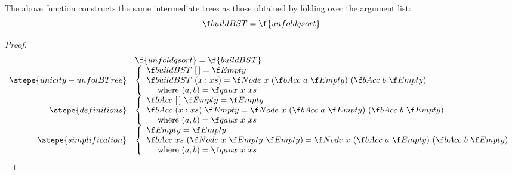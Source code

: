 \documentclass[a4paper,11pt]{llncs}
\begin{document}
\begin{proposition}
\label{prop:buildBST-unfold}
  The above function constructs the same intermediate trees as those
  obtained by folding over the argument list:
  $$
  \buildBST = \f{unfoldqsort}
  $$
\end{proposition}
\begin{proof}
\[
  \begin{array}{rl}
    &\f{unfoldqsort} = \f{buildBST}\\
    \stepe{unicity-unfolBTree}
    &
    \left \{
      \begin{array}[c]{l}
        \buildBST\ \Nil = \Empty \\
        \buildBST\ (x:xs) 
        = \Node\ x\ (\buildBSTacc\ a\ \Empty)\ (\buildBSTacc\ b\
        \Empty) \\
        \quad\mbox{ where } (a,b) = \qaux\ x\ xs
      \end{array}
    \right .
    \\
    \stepe{definitions}
    &
    \left \{
      \begin{array}[c]{l}
        \buildBSTacc\ \Nil\ \Empty = \Empty \\
        \buildBSTacc\ (x:xs)\ \Empty
        = \Node\ x\ (\buildBSTacc\ a\ \Empty)\ (\buildBSTacc\ b\
        \Empty) \\
        \quad\mbox{ where } (a,b) = \qaux\ x\ xs
      \end{array}
    \right . \\
    \stepe{simplification}
    &
    \left \{
      \begin{array}[c]{l}
        \Empty = \Empty \\
        \buildBSTacc\ xs\ (\Node\ x\ \Empty\ \Empty)
        = \Node\ x\ (\buildBSTacc\ a\ \Empty)\ (\buildBSTacc\ b\
        \Empty) \\
        \quad\mbox{ where } (a,b) = \qaux\ x\ xs
      \end{array}
    \right .
  \end{array}
\]


\end{proof}
\end{document}
